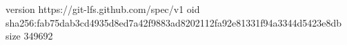 version https://git-lfs.github.com/spec/v1
oid sha256:fab75dab3cd4935d8ed7a42f9883ad8202112fa92e81331f94a3344d5423e8db
size 349692
